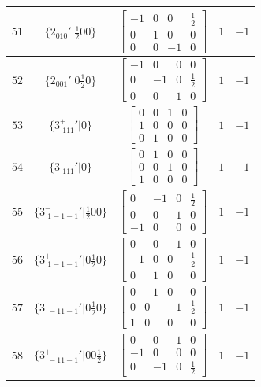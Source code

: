 \documentclass[fleqn,8pt]{jsarticle}
\begin{document}
\begin{longtable}{ccccc}
$ 51 $ & $ \{2{}_{010}{}'|\frac{1}{2} 0 0\} $ & $ \begin{bmatrix} -1 & 0 & 0 & \frac{1}{2} \\ 0 & 1 & 0 & 0 \\ 0 & 0 & -1 & 0 \end{bmatrix} $ & $ 1 $ & $ -1 $ \\ \hline
$ 52 $ & $ \{2{}_{001}{}'|0 \frac{1}{2} 0\} $ & $ \begin{bmatrix} -1 & 0 & 0 & 0 \\ 0 & -1 & 0 & \frac{1}{2} \\ 0 & 0 & 1 & 0 \end{bmatrix} $ & $ 1 $ & $ -1 $ \\ \hline
$ 53 $ & $ \{3^{+}_{\,\,111}{}'|0\} $ & $ \begin{bmatrix} 0 & 0 & 1 & 0 \\ 1 & 0 & 0 & 0 \\ 0 & 1 & 0 & 0 \end{bmatrix} $ & $ 1 $ & $ -1 $ \\ \hline
$ 54 $ & $ \{3^{-}_{\,\,111}{}'|0\} $ & $ \begin{bmatrix} 0 & 1 & 0 & 0 \\ 0 & 0 & 1 & 0 \\ 1 & 0 & 0 & 0 \end{bmatrix} $ & $ 1 $ & $ -1 $ \\ \hline
$ 55 $ & $ \{3^{-}_{\,\,1-1-1}{}'|\frac{1}{2} 0 0\} $ & $ \begin{bmatrix} 0 & -1 & 0 & \frac{1}{2} \\ 0 & 0 & 1 & 0 \\ -1 & 0 & 0 & 0 \end{bmatrix} $ & $ 1 $ & $ -1 $ \\ \hline
$ 56 $ & $ \{3^{+}_{\,\,1-1-1}{}'|0 \frac{1}{2} 0\} $ & $ \begin{bmatrix} 0 & 0 & -1 & 0 \\ -1 & 0 & 0 & \frac{1}{2} \\ 0 & 1 & 0 & 0 \end{bmatrix} $ & $ 1 $ & $ -1 $ \\ \hline
$ 57 $ & $ \{3^{-}_{\,\,-11-1}{}'|0 \frac{1}{2} 0\} $ & $ \begin{bmatrix} 0 & -1 & 0 & 0 \\ 0 & 0 & -1 & \frac{1}{2} \\ 1 & 0 & 0 & 0 \end{bmatrix} $ & $ 1 $ & $ -1 $ \\ \hline
$ 58 $ & $ \{3^{+}_{\,\,-11-1}{}'|0 0 \frac{1}{2}\} $ & $ \begin{bmatrix} 0 & 0 & 1 & 0 \\ -1 & 0 & 0 & 0 \\ 0 & -1 & 0 & \frac{1}{2} \end{bmatrix} $ & $ 1 $ & $ -1 $ \\ \hline

\end{longtable}
\end{document}
